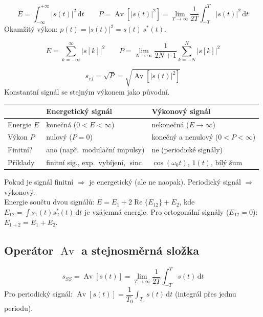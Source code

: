 \documentclass[12pt,a4paper]{article}
\newcommand{\Av}{\operatorname{Av}}
\newcommand{\sinc}{\operatorname{sinc}}
\newcommand{\dd}{\mathrm{d}}
\begin{document}
\begin{matBox}
\[
  E = \int_{-\infty}^{+\infty} |s(t)|^2\,\dd t
  \qquad
  P = \Av\!\left[|s(t)|^2\right] = \lim_{T\to\infty}\frac{1}{2T}\int_{-T}^{T}|s(t)|^2\,\dd t
\]
Okamžitý výkon: $p(t) = |s(t)|^2 = s(t)\,s^*(t)$.
\end{matBox}

\begin{matBox}
\[
  E = \sum_{k=-\infty}^{\infty} |s[k]|^2
  \qquad
  P = \lim_{N\to\infty}\frac{1}{2N+1}\sum_{k=-N}^{N}|s[k]|^2
\]
\end{matBox}

\begin{matBox}
\[
  s_{ef} = \sqrt{P} = \sqrt{\Av\!\left[|s(t)|^2\right]}
\]
Konstantní signál se stejným výkonem jako původní.
\end{matBox}

\begin{center}
\begin{tabular}{lll}
\toprule
 & \textbf{Energetický signál} & \textbf{Výkonový signál} \\
\midrule
Energie $E$ & konečná ($0 < E < \infty$) & nekonečná ($E \to \infty$) \\
Výkon $P$ & nulový ($P = 0$) & konečný a nenulový ($0 < P < \infty$) \\
Finitní? & ano (např.\ modulační impulsy) & ne (periodické signály) \\
Příklady & finitní sig., exp.\ vybíjení, $\sinc$ & $\cos(\omega_0 t)$, $1(t)$, bílý šum \\
\bottomrule
\end{tabular}
\end{center}

\begin{noteBox}[Důležité]
Pokud je signál finitní $\Rightarrow$ je energetický (ale ne naopak). Periodický signál $\Rightarrow$ výkonový.\\
Energie součtu dvou signálů: $E = E_1 + 2\operatorname{Re}\{E_{12}\} + E_2$, kde $E_{12} = \int s_1(t)s_2^*(t)\,\dd t$ je vzájemná energie. Pro ortogonální signály ($E_{12}=0$): $E_{1+2}=E_1+E_2$.
\end{noteBox}

\subsection*{Operátor $\Av$ a stejnosměrná složka}

\begin{matBox}[]
\[
  s_{SS} = \Av[s(t)] = \lim_{T\to\infty}\frac{1}{2T}\int_{-T}^{T}s(t)\,\dd t
\]
Pro periodický signál: $\Av[s(t)] = \dfrac{1}{T_0}\int_{T_0}s(t)\,\dd t$ (integrál přes jednu periodu).
\end{matBox}
\end{document}
